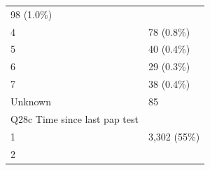 \documentclass[]{article}
\begin{document}
\begin{longtable}[]{@{}ll@{}}
\begin{minipage}[t]{0.23\columnwidth}
98 (1.0\%)\strut
\end{minipage}\tabularnewline
\begin{minipage}[t]{0.71\columnwidth}\raggedright
4\strut
\end{minipage} & \begin{minipage}[t]{0.23\columnwidth}\raggedright
78 (0.8\%)\strut
\end{minipage}\tabularnewline
\begin{minipage}[t]{0.71\columnwidth}\raggedright
5\strut
\end{minipage} & \begin{minipage}[t]{0.23\columnwidth}\raggedright
40 (0.4\%)\strut
\end{minipage}\tabularnewline
\begin{minipage}[t]{0.71\columnwidth}\raggedright
6\strut
\end{minipage} & \begin{minipage}[t]{0.23\columnwidth}\raggedright
29 (0.3\%)\strut
\end{minipage}\tabularnewline
\begin{minipage}[t]{0.71\columnwidth}\raggedright
7\strut
\end{minipage} & \begin{minipage}[t]{0.23\columnwidth}\raggedright
38 (0.4\%)\strut
\end{minipage}\tabularnewline
\begin{minipage}[t]{0.71\columnwidth}\raggedright
Unknown\strut
\end{minipage} & \begin{minipage}[t]{0.23\columnwidth}\raggedright
85\strut
\end{minipage}\tabularnewline
\begin{minipage}[t]{0.71\columnwidth}\raggedright
Q28c Time since last pap test\strut
\end{minipage} & \begin{minipage}[t]{0.23\columnwidth}\raggedright
\strut
\end{minipage}\tabularnewline
\begin{minipage}[t]{0.71\columnwidth}\raggedright
1\strut
\end{minipage} & \begin{minipage}[t]{0.23\columnwidth}\raggedright
3,302 (55\%)\strut
\end{minipage}\tabularnewline
\begin{minipage}[t]{0.71\columnwidth}\raggedright
2\strut
\end{minipage} & \begin{minipage}[t]{0.23\columnwidth}\raggedright

\end{minipage}
\end{longtable}
\end{document}
